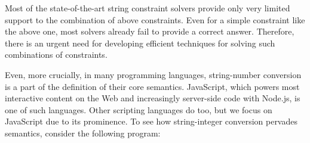 \documentclass[sigplan,review,anonymous]{acmart}\settopmatter{printfolios=true,printccs=false,printacmref=false}
\begin{document}
Most of the state-of-the-art string constraint solvers provide only very limited support to the combination of above constraints. Even for a simple constraint like the above one, most solvers already fail to provide a correct answer. Therefore, there is an urgent  need for developing efficient techniques for solving such combinations of constraints. 




Even, more crucially, in many programming languages, string-number conversion is a part of the definition of their core semantics. 
 JavaScript, which powers most interactive content on the Web and increasingly server-side code with Node.js, is one of such languages. Other scripting languages do too, but we focus on JavaScript due to its prominence. To see how string-integer conversion pervades semantics, consider the following program:







\end{document}
